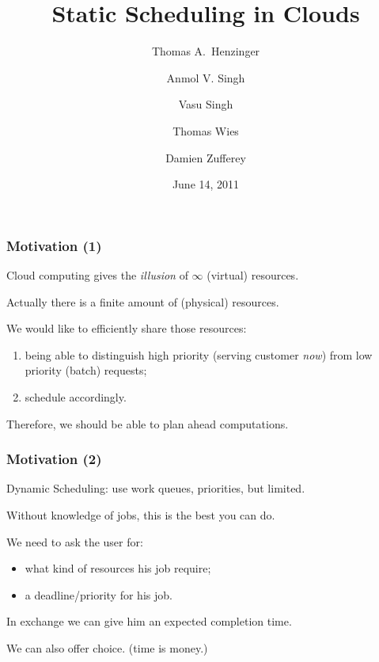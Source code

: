 \documentclass{beamer}
\title[Static Scheduling in Clouds]{Static Scheduling in Clouds}
\author[Damien Zufferey]{
  Thomas A.~Henzinger \and
  Anmol V. Singh \and
  Vasu Singh \and
  Thomas Wies \and
  \alert{Damien Zufferey}
}
\institute{ IST Austria }
\date{June 14, 2011}
\begin{document}
\frame[plain]{\titlepage}

\begin{frame}
  \frametitle{Motivation (1)}
  Cloud computing gives the \emph{illusion} of $\infty$ (virtual) resources.

  \vspace{2ex}
  
  Actually there is a finite amount of (physical) resources.

  \vspace{2ex}
  
  We would like to efficiently share those resources:
  \begin{enumerate}
  \item being able to distinguish high priority (serving customer \emph{now}) from low priority (batch) requests;
  \item schedule accordingly.
  \end{enumerate}
  
  \vspace{2ex}
  
  Therefore, we should be able to \alert{plan ahead} computations.

\end{frame}

\begin{frame}
  \frametitle{Motivation (2)}

  Dynamic Scheduling: use work queues, priorities, but limited.

  \vspace{2ex}
  
  Without knowledge of jobs, this is the best you can do.

  \vspace{1cm}
  
  We need to ask the user for:
  \begin{itemize}
  \item what kind of resources his job require;
  \item a deadline/priority for his job.
  \end{itemize}

  \vspace{2ex}
  
  In exchange we can give him an expected completion time.

  \vspace{1cm}

  We can also offer choice. (time is money.)
  
\end{frame}
\end{document}
